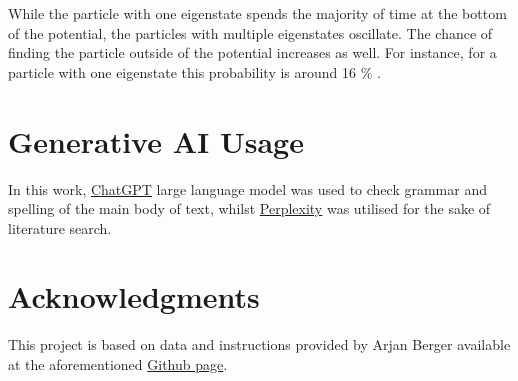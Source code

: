 \documentclass[12pt]{article}
\begin{document}
While the particle with one eigenstate spends the majority of time at the bottom of the potential, the particles with multiple eigenstates oscillate. The chance of finding the particle outside of the potential increases as well. For instance, for a particle with one eigenstate this probability is around 16 \% \citep{the_quant_harmonic_osc}. \\

\section*{Generative AI Usage}
In this work, \href{https://chatgpt.com}{ChatGPT} large language model was used to check grammar and spelling of the main body of text, whilst \href{https://www.perplexity.ai}{Perplexity} was utilised for the sake of literature search.

\section*{Acknowledgments}
This project is based on data and instructions provided by Arjan Berger available at the aforementioned \href{https://github.com/almakhmudov/LTTC-Homework--QD}{Github page}.


\end{document}

